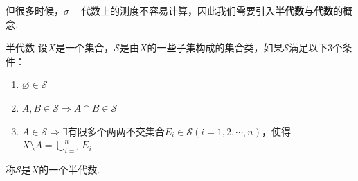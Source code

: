\documentclass[lang=cn,a4paper,11pt,openany,scheme=chinese,twoside]{elegantbook}
\newcommand{\bluebf}[1]{\textcolor{structurecolor}{\textbf{#1}}}
\begin{document}
但很多时候，$\sigma-\text{代数}$上的测度不容易计算，因此我们需要引入\bluebf{半代数}与\bluebf{代数}的概念.
\begin{definition}{半代数}
    设$X$是一个集合，$\mathcal{S}$是由$X$的一些子集构成的集合类，如果$\mathcal{S}$满足以下3个条件：
    \begin{enumerate}
        \item $\varnothing\in\mathcal{S}$
        \item $A,B\in\mathcal{S}\Rightarrow A\cap B\in\mathcal{S}$
        \item $A\in\mathcal{S}\Rightarrow \exists\text{有限多个两两不交集合}E_i\in\mathcal{S}(i=1,2,\cdots,n)$，使得$X\setminus A=\bigcup_{i=1}^n{E_i}$
    \end{enumerate}
    称$\mathcal{S}$是$X$的一个半代数.
\end{definition}
\end{document}
